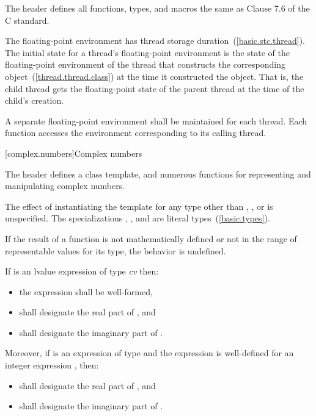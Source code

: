 \pnum
The header defines all functions, types, and macros the same as
Clause 7.6 of the C standard.

\pnum
The floating-point environment has thread storage
duration~(\ref{basic.stc.thread}). The initial state for a thread's floating-point
environment is the state of the floating-point environment of the thread that constructs
the corresponding  object~(\ref{thread.thread.class}) at the time it
constructed the object. \enternote That is, the child thread gets the floating-point
state of the parent thread at the time of the child's creation. \exitnote

\pnum
A separate floating-point environment shall be maintained for each thread. Each function
accesses the environment corresponding to its calling thread.

[complex.numbers]{Complex numbers}

\pnum
The header
%
defines a
class template,
and numerous functions for representing and manipulating complex numbers.

\pnum
The effect of instantiating the template
for any type other than , , or  is unspecified.
The specializations
,
, and
 are literal types~(\ref{basic.types}).

\pnum
If the result of a function is not mathematically defined or not in
the range of representable values for its type, the behavior is
undefined.

\pnum
If  is an lvalue expression of type \emph{cv}  then:

\begin{itemize}
\item the expression  shall be well-formed,
\item {} shall designate the real part of , and
\item {} shall designate the imaginary part of .
\end{itemize}

Moreover, if  is an expression of type  and the expression  is well-defined for an integer expression , then:

\begin{itemize}
\item {} shall designate the real part of , and
\item {} shall designate the imaginary part of .
\end{itemize}

